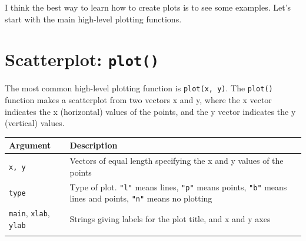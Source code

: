 \documentclass[]{book}
\theoremstyle{definition}
\theoremstyle{definition}
\theoremstyle{remark}
\begin{document}
I think the best way to learn how to create plots is to see some
examples. Let's start with the main high-level plotting functions.

\section{\texorpdfstring{Scatterplot:
\texttt{plot()}}{Scatterplot: plot()}}\label{scatterplot-plot}

The most common high-level plotting function is \texttt{plot(x,\ y)}.
The \texttt{plot()} function makes a scatterplot from two vectors x and
y, where the x vector indicates the x (horizontal) values of the points,
and the y vector indicates the y (vertical) values.

\begin{longtable}[]{@{}ll@{}}
\toprule
\begin{minipage}[b]{0.18\columnwidth}\raggedright\strut
Argument\strut
\end{minipage} & \begin{minipage}[b]{0.67\columnwidth}\raggedright\strut
Description\strut
\end{minipage}\tabularnewline
\midrule
\endhead
\begin{minipage}[t]{0.18\columnwidth}\raggedright\strut
\texttt{x,\ y}\strut
\end{minipage} & \begin{minipage}[t]{0.67\columnwidth}\raggedright\strut
Vectors of equal length specifying the x and y values of the
points\strut
\end{minipage}\tabularnewline
\begin{minipage}[t]{0.18\columnwidth}\raggedright\strut
\texttt{type}\strut
\end{minipage} & \begin{minipage}[t]{0.67\columnwidth}\raggedright\strut
Type of plot. \texttt{"l"} means lines, \texttt{"p"} means points,
\texttt{"b"} means lines and points, \texttt{"n"} means no
plotting\strut
\end{minipage}\tabularnewline
\begin{minipage}[t]{0.18\columnwidth}\raggedright\strut
\texttt{main}, \texttt{xlab}, \texttt{ylab}\strut
\end{minipage} & \begin{minipage}[t]{0.67\columnwidth}\raggedright\strut
Strings giving labels for the plot title, and x and y axes\strut
\end{minipage}\tabularnewline
\begin{minipage}[t]{0.18\columnwidth}\raggedright\strut

\end{minipage}
\end{longtable}
\end{document}
